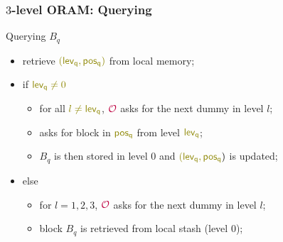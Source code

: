 \documentclass[]{beamer}
\newcommand{\owner}{\mathcal{O}}
\begin{document}
{\begin{frame}
\frametitle{$3$-level ORAM: Querying}
{\color{purple}Querying $ B_q$}
\begin{itemize}[<+->]
\item retrieve $\color{olive}({\mathsf{lev_q,pos_q}})$ from local memory;
\item if $\color{olive}{\mathsf{lev_q}}\ne 0$ 
    \begin{itemize}
        \item for all $\color{olive} l\ne{\mathsf{lev_q}}$, $\color{purple}\owner$ asks 
            for the next {\color{teal} dummy} in level $l$;
        \item asks for block in ${\color{olive} \mathsf{pos_q}}$ from level ${\color{olive} \mathsf{lev_q}}$;
        \item $B_q$ is then stored in level $0$ and ${\color{olive}(\mathsf{lev_q,pos_q}})$ is updated;
    \end{itemize}
    \item else
    \begin{itemize}
        \item for $l=1,2,3$, $\color{purple}\owner$ asks for the next {\color{teal} dummy} in level $l$;
        \item block $B_q$ is retrieved from local stash (level 0);
    \end{itemize}
\end{itemize}
\end{frame}

}
\end{document}

